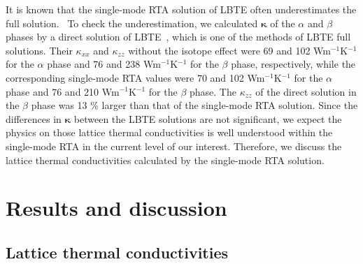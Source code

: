 \documentclass[twocolumn,amsmath,amssymb,a4paper,prb,superscriptaddress,floatfix]{revtex4-1}
\begin{document}
It is known that the single-mode RTA solution of LBTE often underestimates the
full solution.~\cite{mukhopadhyay-ltc,ward-ltc} To check the underestimation, we
calculated $\boldsymbol{\kappa}$ of the $\alpha$ and $\beta$ phases by a direct
solution of LBTE~\cite{chaput-direct}, which is one of the methods of LBTE full
solutions. Their $\kappa_{xx}$ and $\kappa_{zz}$ without the isotope effect were
69 and 102 Wm$^{-1}$K$^{-1}$ for  the $\alpha$ phase and 76 and 238
Wm$^{-1}$K$^{-1}$ for the $\beta$ phase, respectively, while the corresponding
single-mode RTA values were 70 and 102 Wm$^{-1}$K$^{-1}$ for the $\alpha$ phase
and 76 and 210 Wm$^{-1}$K$^{-1}$ for the $\beta$ phase. The $\kappa_{zz}$ of the
direct solution in the $\beta$ phase was 13 \% larger than that of the
single-mode RTA solution. Since the differences in $\boldsymbol{\kappa}$ between
the LBTE solutions are not significant, we expect the physics on those lattice
thermal conductivities is well understood within the single-mode RTA in the
current level of our interest. Therefore, we discuss the lattice thermal
conductivities calculated by the single-mode RTA solution.

\section{Results and discussion}

\subsection{Lattice thermal conductivities}
\end{document}

